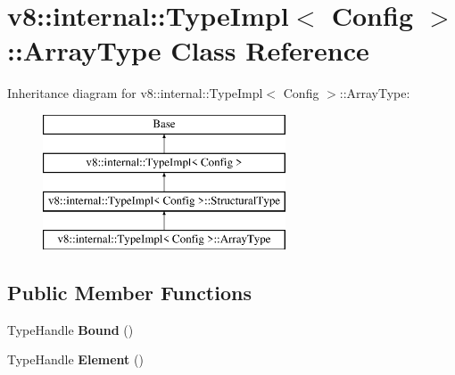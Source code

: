 \hypertarget{classv8_1_1internal_1_1_type_impl_1_1_array_type}{}\section{v8\+:\+:internal\+:\+:Type\+Impl$<$ Config $>$\+:\+:Array\+Type Class Reference}
\label{classv8_1_1internal_1_1_type_impl_1_1_array_type}
Inheritance diagram for v8\+:\+:internal\+:\+:Type\+Impl$<$ Config $>$\+:\+:Array\+Type\+:\begin{figure}[H]
\begin{center}
\leavevmode
\includegraphics[height=4.000000cm]{classv8_1_1internal_1_1_type_impl_1_1_array_type}
\end{center}
\end{figure}
\subsection*{Public Member Functions}
\begin{DoxyCompactItemize}
\item 
\hypertarget{classv8_1_1internal_1_1_type_impl_1_1_array_type_aa923052efd22ee66049a7203dc8fea49}{}Type\+Handle {\bfseries Bound} ()\label{classv8_1_1internal_1_1_type_impl_1_1_array_type_aa923052efd22ee66049a7203dc8fea49}

\item 
\hypertarget{classv8_1_1internal_1_1_type_impl_1_1_array_type_acbaea05ea518a412f0a08bde6d0ec36d}{}Type\+Handle {\bfseries Element} ()\label{classv8_1_1internal_1_1_type_impl_1_1_array_type_acbaea05ea518a412f0a08bde6d0ec36d}

\end{DoxyCompactItemize}
